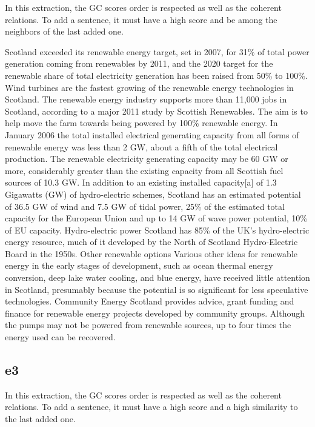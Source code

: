 In this extraction, the GC scores order is respected as well as the coherent relations.
To add a sentence, it must have a high score and be among the neighbors of the last added one.

\begin{tcolorbox}\footnotesize
	Scotland exceeded its renewable energy target, set in 2007, for 31\% of total power generation coming from renewables by 2011, and the 2020 target for the renewable share of total electricity generation has been raised from 50\% to 100\%.
	Wind turbines are the fastest growing of the renewable energy technologies in Scotland.
	The renewable energy industry supports more than 11,000 jobs in Scotland, according to a major 2011 study by Scottish Renewables.
	The aim is to help move the farm towards being powered by 100\% renewable energy.
	In January 2006 the total installed electrical generating capacity from all forms of renewable energy was less than 2 GW, about a fifth of the total electrical production.
	The renewable electricity generating capacity may be 60 GW or more, considerably greater than the existing capacity from all Scottish fuel sources of 10.3 GW.
	In addition to an existing installed capacity[a] of 1.3 Gigawatts (GW) of hydro-electric schemes, Scotland has an estimated potential of 36.5 GW of wind and 7.5 GW of tidal power, 25\% of the estimated total capacity for the European Union and up to 14 GW of wave power potential, 10\% of EU capacity.
	Hydro-electric power Scotland has 85\% of the UK's hydro-electric energy resource, much of it developed by the North of Scotland Hydro-Electric Board in the 1950s.
	Other renewable options Various other ideas for renewable energy in the early stages of development, such as ocean thermal energy conversion, deep lake water cooling, and blue energy, have received little attention in Scotland, presumably because the potential is so significant for less speculative technologies.
	Community Energy Scotland provides advice, grant funding and finance for renewable energy projects developed by community groups.
	Although the pumps may not be powered from renewable sources, up to four times the energy used can be recovered.
\end{tcolorbox}

\subsection{e3}

In this extraction, the GC scores order is respected as well as the coherent relations.
To add a sentence, it must have a high score and a high similarity to the last added one.

